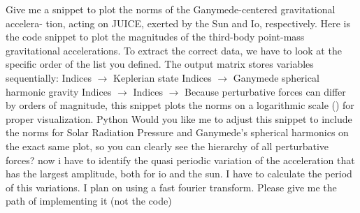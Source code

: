 {}Give me a snippet to plot the norms of the Ganymede-centered gravitational accelera- tion, acting on JUICE, exerted by the Sun and Io, respectively.\markdownRendererInterblockSeparator
{}\markdownRendererSectionBegin
{}\markdownRendererInterblockSeparator
{}Here is the code snippet to plot the magnitudes of the third-body point-mass gravitational accelerations.\markdownRendererInterblockSeparator
{}To extract the correct data, we have to look at the specific order of the  list you defined. The output matrix stores variables sequentially:\markdownRendererInterblockSeparator
{}\markdownRendererUlBegin
\markdownRendererUlItem Indices  $\rightarrow$ Keplerian state\markdownRendererUlItemEnd 
\markdownRendererUlItem Indices  $\rightarrow$ Ganymede spherical harmonic gravity\markdownRendererUlItemEnd 
\markdownRendererUlItem Indices  $\rightarrow$ \markdownRendererUlItemEnd 
\markdownRendererUlItem Indices  $\rightarrow$ \markdownRendererUlItemEnd 
\markdownRendererUlEnd \markdownRendererInterblockSeparator
{}Because perturbative forces can differ by orders of magnitude, this snippet plots the norms on a logarithmic scale () for proper visualization.\markdownRendererInterblockSeparator
{}Python\markdownRendererInterblockSeparator
{}\markdownRendererInterblockSeparator
{}Would you like me to adjust this snippet to include the norms for Solar Radiation Pressure and Ganymede's spherical harmonics on the exact same plot, so you can clearly see the hierarchy of all perturbative forces?\markdownRendererInterblockSeparator
{}\markdownRendererThematicBreak{}\markdownRendererInterblockSeparator
{}
\markdownRendererSectionEnd \markdownRendererSectionBegin
{}\markdownRendererInterblockSeparator
{}now i have to identify the quasi periodic variation of the acceleration that has the largest amplitude, both for io and the sun. I have to calculate the period of this variations. I plan on using a fast fourier transform. Please give me the path of implementing it (not the code)\markdownRendererInterblockSeparator
{}
\markdownRendererSectionEnd \markdownRendererSectionBegin
